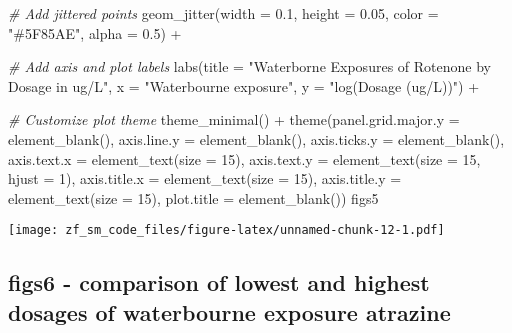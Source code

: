 \documentclass[
]{article}
\newenvironment{Shaded}{\begin{snugshade}}{\end{snugshade}}
\newcommand{\AttributeTok}[1]{\textcolor[rgb]{0.77,0.63,0.00}{#1}}
\newcommand{\CommentTok}[1]{\textcolor[rgb]{0.56,0.35,0.01}{\textit{#1}}}
\newcommand{\DecValTok}[1]{\textcolor[rgb]{0.00,0.00,0.81}{#1}}
\newcommand{\FloatTok}[1]{\textcolor[rgb]{0.00,0.00,0.81}{#1}}
\newcommand{\FunctionTok}[1]{\textcolor[rgb]{0.00,0.00,0.00}{#1}}
\newcommand{\NormalTok}[1]{#1}
\newcommand{\SpecialCharTok}[1]{\textcolor[rgb]{0.00,0.00,0.00}{#1}}
\newcommand{\StringTok}[1]{\textcolor[rgb]{0.31,0.60,0.02}{#1}}
\begin{document}
\begin{Shaded}
\begin{Highlighting}[]
  \CommentTok{\# Add jittered points}
  \FunctionTok{geom\_jitter}\NormalTok{(}\AttributeTok{width =} \FloatTok{0.1}\NormalTok{, }\AttributeTok{height =} \FloatTok{0.05}\NormalTok{, }\AttributeTok{color =} \StringTok{"\#5F85AE"}\NormalTok{, }\AttributeTok{alpha =} \FloatTok{0.5}\NormalTok{) }\SpecialCharTok{+}
  
  \CommentTok{\# Add axis and plot labels}
  \FunctionTok{labs}\NormalTok{(}\AttributeTok{title =} \StringTok{"Waterborne Exposures of Rotenone by Dosage in ug/L"}\NormalTok{, }\AttributeTok{x =} \StringTok{"Waterbourne exposure"}\NormalTok{, }\AttributeTok{y =} \StringTok{"log(Dosage (ug/L))"}\NormalTok{) }\SpecialCharTok{+}
  
  \CommentTok{\# Customize plot theme}
  \FunctionTok{theme\_minimal}\NormalTok{() }\SpecialCharTok{+}
  \FunctionTok{theme}\NormalTok{(}\AttributeTok{panel.grid.major.y =} \FunctionTok{element\_blank}\NormalTok{(),}
        \AttributeTok{axis.line.y =} \FunctionTok{element\_blank}\NormalTok{(),}
        \AttributeTok{axis.ticks.y =} \FunctionTok{element\_blank}\NormalTok{(),}
        \AttributeTok{axis.text.x =} \FunctionTok{element\_text}\NormalTok{(}\AttributeTok{size =} \DecValTok{15}\NormalTok{),}
        \AttributeTok{axis.text.y =} \FunctionTok{element\_text}\NormalTok{(}\AttributeTok{size =} \DecValTok{15}\NormalTok{, }\AttributeTok{hjust =} \DecValTok{1}\NormalTok{),}
        \AttributeTok{axis.title.x =} \FunctionTok{element\_text}\NormalTok{(}\AttributeTok{size =} \DecValTok{15}\NormalTok{),}
        \AttributeTok{axis.title.y =} \FunctionTok{element\_text}\NormalTok{(}\AttributeTok{size =} \DecValTok{15}\NormalTok{),}
        \AttributeTok{plot.title =} \FunctionTok{element\_blank}\NormalTok{())}
\NormalTok{figs5}
\end{Highlighting}
\end{Shaded}

\texttt{[image: zf\_sm\_code\_files/figure-latex/unnamed-chunk-12-1.pdf]}

\hypertarget{figs6---comparison-of-lowest-and-highest-dosages-of-waterbourne-exposure-atrazine}{%
\subsection{figs6 - comparison of lowest and highest dosages of
waterbourne exposure
atrazine}\label{figs6---comparison-of-lowest-and-highest-dosages-of-waterbourne-exposure-atrazine}}
\end{document}
